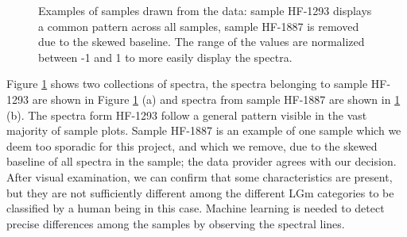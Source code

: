 \begin{figure}[H]

    \centering
    \qquad
    \caption{Examples of samples drawn from the data: sample HF-1293 displays a common pattern across all samples, sample HF-1887 is removed due to the skewed baseline. The range of the values are normalized between -1 and 1 to more easily display the spectra.
    \label{fig:spectrum}}%
\end{figure}

Figure \ref{fig:spectrum} shows two collections of spectra, the spectra belonging to sample HF-1293 are shown in Figure \ref{fig:spectrum} (a) and spectra from sample HF-1887 are shown in \ref{fig:spectrum} (b). The spectra form HF-1293 follow a general pattern visible in the vast majority of sample plots.
Sample HF-1887 is an example of one sample which we deem too sporadic for this project, and which we remove, due to the skewed baseline of all spectra in the sample; the data provider  agrees with our decision. After visual examination, we can confirm that some characteristics are present, but they are not sufficiently different among the different LGm categories to be classified by a human being in this case. Machine learning is needed to detect precise differences among the samples by observing the spectral lines.

